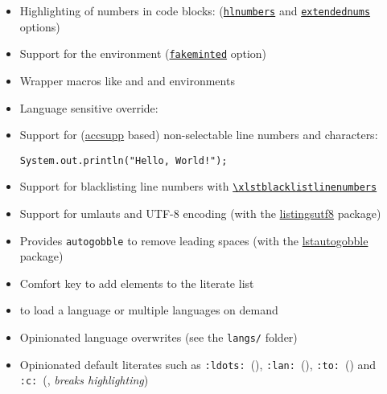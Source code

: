 \documentclass[10pt,DIV=12]{scrartcl}
\let\T\texttt
\def\argref#1#2{\hyperref[arg:#1]{\T{#2}}}
\def\cmdref#1{\hyperref[arg:#1]{\T{\xlstGetStyle{command}\textbackslash #1}}}
\begin{document}
\begin{itemize}[nosep,itemsep=2pt,leftmargin=*]
    \item Highlighting of numbers in code blocks: \; (\argref{hlnumbers}{hlnumbers} and \argref{extendednums}{extendednums} options)
    \item Support for the  environment (\argref{fakeminted}{fakeminted} option)
    \item Wrapper macros like  and  and environments 
    \item Language sensitive override: 
    \item Support for (\href{https://ctan.org/pkg/accsupp}{accsupp} based) non-selectable line numbers and characters:
\begin{verbatim}
System.out.println("Hello, World!");
\end{verbatim}
    \item Support for blacklisting line numbers with \cmdref{xlstblacklistlinenumbers}
    \item Support for umlauts and UTF-8 encoding (with the \href{https://ctan.org/pkg/listingsutf8
    }{listingsutf8} package)
    \item Provides \texttt{autogobble} to remove leading spaces (with the \href{https://ctan.org/pkg/lstautogobble}{lstautogobble} package)
    \item Comfort key  to add elements to the literate list
    \item {} to load a language or multiple languages on demand
    \item Opinionated language overwrites (see the \T{langs/} folder)
    \item Opinionated default literates such as \T{:ldots:}~(), \T{:lan:}~(), \T{:to:}~() and \T{:c:}~(, \textit{breaks highlighting})
\end{itemize}
\end{document}
